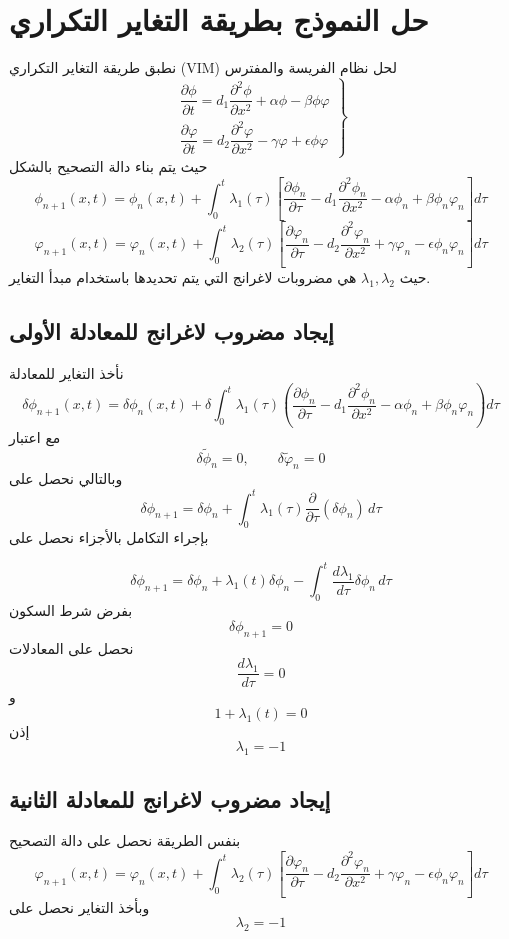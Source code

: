 \section{حل النموذج بطريقة التغاير التكراري}
نطبق طريقة التغاير التكراري (VIM) لحل نظام الفريسة والمفترس
\[
\left.\begin{array}{c}
	\dfrac{\partial \phi}{\partial t} = d_1  \dfrac{\partial^2\phi}{\partial x^2} + \alpha\phi - \beta\phi\varphi\\[12pt]
	\dfrac{\partial \varphi}{\partial t} = d_2  \dfrac{\partial^2\varphi}{\partial x^2} -  \gamma\varphi + \epsilon\phi\varphi
\end{array}\right\}
\]
حيث يتم بناء دالة التصحيح بالشكل
\[
\phi_{n+1}(x,t)=\phi_n(x,t)+
\int_0^t \lambda_1(\tau)
\left[
\frac{\partial \phi_n}{\partial \tau}
- d_1 \frac{\partial^2 \phi_n}{\partial x^2}
- \alpha \phi_n
+ \beta \phi_n \varphi_n
\right] d\tau
\]
\[
\varphi_{n+1}(x,t)=\varphi_n(x,t)+
\int_0^t \lambda_2(\tau)
\left[
\frac{\partial \varphi_n}{\partial \tau}
- d_2 \frac{\partial^2 \varphi_n}{\partial x^2}
+ \gamma \varphi_n
- \epsilon \phi_n \varphi_n
\right] d\tau
\]
حيث $\lambda_1,\lambda_2$ هي مضروبات لاغرانج التي يتم تحديدها باستخدام مبدأ التغاير.
\subsection*{إيجاد مضروب لاغرانج للمعادلة الأولى}
نأخذ التغاير للمعادلة
\[
\delta \phi_{n+1}(x,t)
=
\delta \phi_n(x,t)
+
\delta
\int_0^t
\lambda_1(\tau)
\left(
\frac{\partial \phi_n}{\partial \tau}
- d_1 \frac{\partial^2 \phi_n}{\partial x^2}
- \alpha \phi_n
+ \beta \phi_n \varphi_n
\right)d\tau
\]
مع اعتبار
\[
\delta \tilde{\phi}_n = 0 , \qquad
\delta \tilde{\varphi}_n =0
\]
وبالتالي نحصل على
\[
\delta \phi_{n+1}
=
\delta \phi_n
+
\int_0^t
\lambda_1(\tau)
\frac{\partial}{\partial \tau}
(\delta \phi_n)
\, d\tau
\]
بإجراء التكامل بالأجزاء نحصل على

\[
\delta \phi_{n+1}
=
\delta \phi_n
+
\lambda_1(t)\delta\phi_n
-
\int_0^t
\frac{d\lambda_1}{d\tau}
\delta\phi_n
\,d\tau
\]
بفرض شرط السكون
\[
\delta\phi_{n+1}=0
\]
نحصل على المعادلات
\[
\frac{d\lambda_1}{d\tau}=0
\]
و
\[
1+\lambda_1(t)=0
\]
إذن
\[
\lambda_1=-1
\]
\subsection*{إيجاد مضروب لاغرانج للمعادلة الثانية}
بنفس الطريقة نحصل على دالة التصحيح
\[
\varphi_{n+1}(x,t)=\varphi_n(x,t)+
\int_0^t \lambda_2(\tau)
\left[
\frac{\partial \varphi_n}{\partial \tau}
- d_2 \frac{\partial^2 \varphi_n}{\partial x^2}
+ \gamma \varphi_n
- \epsilon \phi_n \varphi_n
\right] d\tau
\]
وبأخذ التغاير نحصل على
\[
\lambda_2=-1
\]
